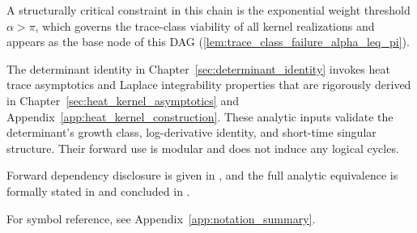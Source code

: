 A structurally critical constraint in this chain is the exponential weight threshold \( \alpha > \pi \), which governs the trace-class viability of all kernel realizations and appears as the base node of this DAG (\cref{lem:trace_class_failure_alpha_leq_pi}).

\begin{remark}
The determinant identity in Chapter~\ref{sec:determinant_identity} invokes heat trace asymptotics and Laplace integrability properties that are rigorously derived in Chapter~\ref{sec:heat_kernel_asymptotics} and Appendix~\ref{app:heat_kernel_construction}. These analytic inputs validate the determinant’s growth class, log-derivative identity, and short-time singular structure. Their forward use is modular and does not induce any logical cycles.
\end{remark}

Forward dependency disclosure is given in , and the full analytic equivalence is formally stated in  and concluded in .

For symbol reference, see Appendix~\ref{app:notation_summary}.

